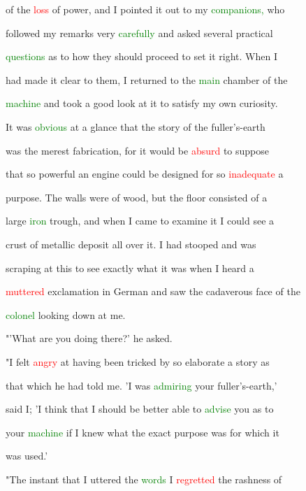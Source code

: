 of the \textcolor{red}{loss} of power, and I pointed it out to my \textcolor{green}{companions,} who

 followed my remarks very \textcolor{green}{carefully} and asked several practical

 \textcolor{green}{questions} as to how they should proceed to set it right. When I

 had made it clear to them, I returned to the \textcolor{green}{main} chamber of the

 \textcolor{green}{machine} and took a \textcolor{BurntOrange}{good} look at it to satisfy my own \textcolor{BurntOrange}{curiosity.}

 It was \textcolor{green}{obvious} at a glance that the story of the fuller's-earth

 was the merest \textcolor{BurntOrange}{fabrication,} for it would be \textcolor{red}{absurd} to suppose

 that so \textcolor{BurntOrange}{powerful} an engine could be designed for so \textcolor{red}{inadequate} a

 purpose. The walls were of wood, but the floor consisted of a

 large \textcolor{green}{iron} trough, and when I came to examine it I could see a

 crust of metallic deposit all over it. I had stooped and was

 scraping at this to see exactly what it was when I heard a

 \textcolor{red}{muttered} exclamation in German and saw the cadaverous face of the

 \textcolor{green}{colonel} looking down at me.



 "'What are you doing there?' he asked.



 "I felt \textcolor{red}{angry} at having been tricked by so elaborate a story as

 that which he had told me. 'I was \textcolor{green}{admiring} your fuller's-earth,'

 said I; 'I think that I should be better able to \textcolor{green}{advise} you as to

 your \textcolor{green}{machine} if I knew what the exact purpose was for which it

 was used.'



 "The instant that I uttered the \textcolor{green}{words} I \textcolor{red}{regretted} the rashness of


